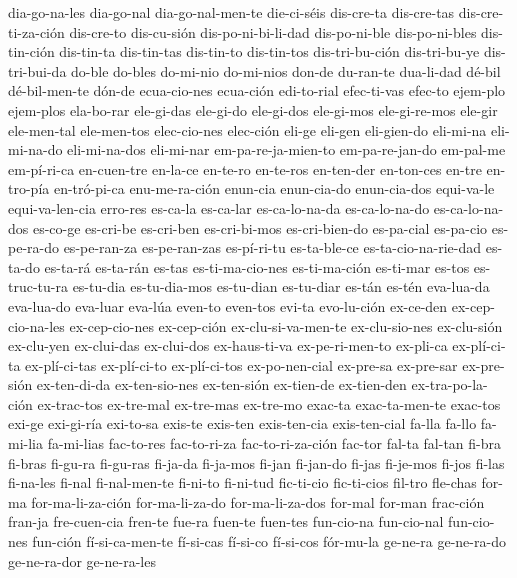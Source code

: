 {dia-go-na-les dia-go-nal dia-go-nal-men-te die-ci-séis dis-cre-ta dis-cre-tas
dis-cre-ti-za-ción dis-cre-to dis-cu-sión dis-po-ni-bi-li-dad dis-po-ni-ble dis-po-ni-bles
dis-tin-ción dis-tin-ta dis-tin-tas dis-tin-to dis-tin-tos dis-tri-bu-ción dis-tri-bu-ye
dis-tri-bui-da do-ble do-bles do-mi-nio do-mi-nios don-de du-ran-te dua-li-dad dé-bil
dé-bil-men-te dón-de ecua-cio-nes ecua-ción edi-to-rial efec-ti-vas efec-to ejem-plo
ejem-plos ela-bo-rar ele-gi-das ele-gi-do ele-gi-dos ele-gi-mos ele-gi-re-mos ele-gir
ele-men-tal ele-men-tos elec-cio-nes elec-ción eli-ge eli-gen eli-gien-do eli-mi-na
eli-mi-na-do eli-mi-na-dos eli-mi-nar em-pa-re-ja-mien-to em-pa-re-jan-do em-pal-me
em-pí-ri-ca en-cuen-tre en-la-ce en-te-ro en-te-ros en-ten-der en-ton-ces en-tre en-tro-pía
en-tró-pi-ca enu-me-ra-ción enun-cia enun-cia-do enun-cia-dos equi-va-le equi-va-len-cia
erro-res es-ca-la es-ca-lar es-ca-lo-na-da es-ca-lo-na-do es-ca-lo-na-dos es-co-ge es-cri-be
es-cri-ben es-cri-bi-mos es-cri-bien-do es-pa-cial es-pa-cio es-pe-ra-do es-pe-ran-za
es-pe-ran-zas es-pí-ri-tu es-ta-ble-ce es-ta-cio-na-rie-dad es-ta-do es-ta-rá es-ta-rán
es-tas es-ti-ma-cio-nes es-ti-ma-ción es-ti-mar es-tos es-truc-tu-ra es-tu-dia es-tu-dia-mos
es-tu-dian es-tu-diar es-tán es-tén eva-lua-da eva-lua-do eva-luar eva-lúa even-to even-tos
evi-ta evo-lu-ción ex-ce-den ex-cep-cio-na-les ex-cep-cio-nes ex-cep-ción
ex-clu-si-va-men-te ex-clu-sio-nes ex-clu-sión ex-clu-yen ex-clui-das ex-clui-dos
ex-haus-ti-va ex-pe-ri-men-to ex-pli-ca ex-plí-ci-ta ex-plí-ci-tas ex-plí-ci-to
ex-plí-ci-tos ex-po-nen-cial ex-pre-sa ex-pre-sar ex-pre-sión ex-ten-di-da ex-ten-sio-nes
ex-ten-sión ex-tien-de ex-tien-den ex-tra-po-la-ción ex-trac-tos ex-tre-mal ex-tre-mas
ex-tre-mo exac-ta exac-ta-men-te exac-tos exi-ge exi-gi-ría exi-to-sa exis-te exis-ten
exis-ten-cia exis-ten-cial fa-lla fa-llo fa-mi-lia fa-mi-lias fac-to-res fac-to-ri-za
fac-to-ri-za-ción fac-tor fal-ta fal-tan fi-bra fi-bras fi-gu-ra fi-gu-ras fi-ja-da
fi-ja-mos fi-jan fi-jan-do fi-jas fi-je-mos fi-jos fi-las fi-na-les fi-nal fi-nal-men-te
fi-ni-to fi-ni-tud fic-ti-cio fic-ti-cios fil-tro fle-chas for-ma for-ma-li-za-ción
for-ma-li-za-do for-ma-li-za-dos for-mal for-man frac-ción fran-ja fre-cuen-cia fren-te
fue-ra fuen-te fuen-tes fun-cio-na fun-cio-nal fun-cio-nes fun-ción fí-si-ca-men-te
fí-si-cas fí-si-co fí-si-cos fór-mu-la ge-ne-ra ge-ne-ra-do ge-ne-ra-dor ge-ne-ra-les
}

